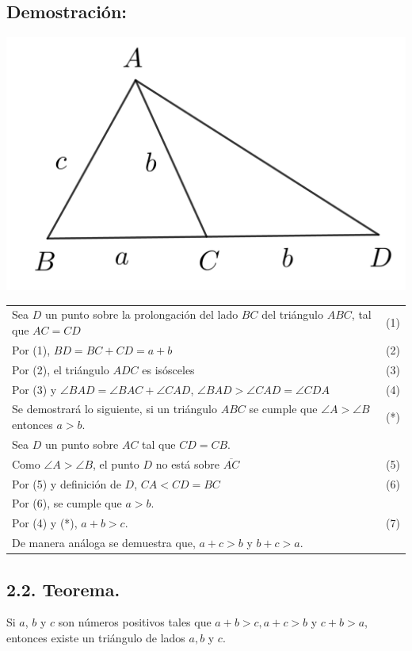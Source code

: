 \documentclass[12pt,a4paper]{article}
\begin{document}
\subsection*{Demostración:}
\begin{center}
\includegraphics[scale=0.7]{demo2.png} 
\end{center}
\begin{tabular}{p{15.9cm} p{1cm}}\\
Sea $D$ un punto sobre la prolongación del lado $BC$ del triángulo $ABC$, tal que $AC=CD$ & (1)
\\Por (1), $BD=BC+CD=a+b$ & (2)
\\Por (2), el triángulo $ADC$ es isósceles & (3) 
\\Por (3) y $\angle BAD =\angle BAC +\angle CAD$, $\angle BAD > \angle CAD = \angle CDA$ &(4)
\\Se  demostrará lo siguiente, si un triángulo $ABC$ se cumple que $\angle A > \angle B$ entonces $a > b$. &(*)
\\Sea $D$ un punto sobre $AC$ tal que $CD=CB$.
\\Como $\angle A > \angle B$, el punto $D$ no está sobre $\overline{AC}$ & (5)
\\Por (5) y definición de $D$, $CA<CD=BC$ &(6)
\\Por (6), se cumple que $a>b$.
\\Por (4) y (*), $a+b>c$. &
(7)
\\De manera análoga se demuestra que, $a+c>b$ y $b+c>a$.
\end{tabular}
\subsection*{2.2. Teorema.}
Si $a$, $b$ y $c$ son números positivos tales que $a+b>c, a+c>b$ y $c+b>a$, entonces existe un triángulo de lados $a, b$ y $c$.\\
\end{document}
